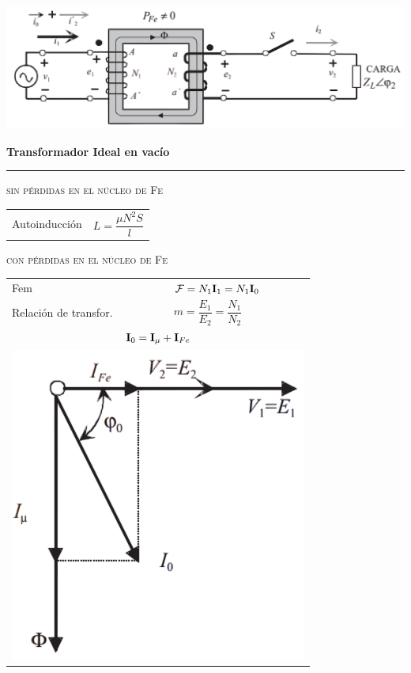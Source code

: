 \documentclass[11pt,a4paper]{article}
\newcommand{\fasor}[1]{\uppercase{\textbf{#1}}}
\newcommand{\subtitulo}[1]{
	\textbf{#1} \\ \vspace{.1cm} {\color{gray} \hrule}
}
\newcommand{\subsubtitulo}[1]{
	\begin{flushleft}
		\vspace{.1cm}
		\textsc{#1}
		\vspace{.1cm}
	\end{flushleft}
}
\begin{document}
	\begin{cajita}
		\centering
		
		\includegraphics[width = .8\linewidth]{trafo-ideal}
		\begin{multicols}{2}
		
			\begin{center}
				\subtitulo{Transformador Ideal \textnormal{en vacío} \vspace{.1cm}} 
			\end{center}
			
			\subsubtitulo{sin pérdidas en el núcleo de Fe} 
			
			\begin{tabular}{l l}
				Autoinducción & $L = \dfrac{\mu N^2 S}{l}$ \\
			\end{tabular}
		
			\subsubtitulo{con pérdidas en el núcleo de Fe}
			
			\begin{tabular}{l l}
				Fem & $\mathcal{F} = N_1  \fasor{i}_1  = N_1  \fasor{i}_0$\\
				Relación de transfor. & $m = \dfrac{E_1}{E_2} = \dfrac{N_1}{N_2}$ \\
				\multicolumn{2}{c}{$ \fasor{i}_0 = \fasor{i}_\mu + \fasor{i}_{Fe} $} \vspace{.1cm} \\ 
				\multicolumn{2}{c}{\includegraphics[width = .5\linewidth]{vacio-fasores}} \\
			\end{tabular} 
		

\end{multicols}
\end{cajita}
\end{document}
